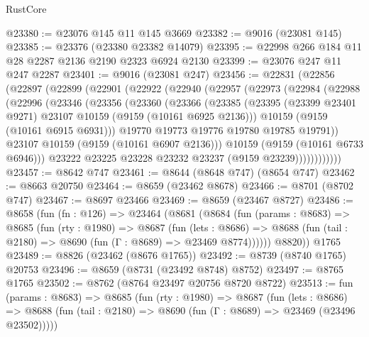 \begin{lexlean}{RustCore}
\begin{coremodule}
@23380 := @23076 @145 @11 @145 @3669
@23382 := @9016 (@23081 @145)
@23385 := @23376 (@23380 @23382 @14079)
@23395 := @22998 @266 @184 @11 @28 @2287 @2136 @2190 @2323 @6924 @2130
@23399 := @23076 @247 @11 @247 @2287
@23401 := @9016 (@23081 @247)
@23456 := @22831
    (@22856
      (@22897
        (@22899
          (@22901
            (@22922
              (@22940
                (@22957
                  (@22973
                    (@22984
                      (@22988
                        (@22996
                          (@23346
                            (@23356
                              (@23360
                                (@23366
                                  (@23385
                                    (@23395
                                      (@23399 @23401 @9271)
                                      @23107
                                      @10159
                                      (@9159 (@10161 @6925 @2136)))
                                    @10159
                                    (@9159 (@10161 @6915 @6931)))
                                  @19770
                                  @19773
                                  @19776
                                  @19780
                                  @19785
                                  @19791))
                              @23107
                              @10159
                              (@9159 (@10161 @6907 @2136)))
                            @10159
                            (@9159 (@10161 @6733 @6946)))
                          @23222
                          @23225
                          @23228
                          @23232
                          @23237
                          (@9159 @23239))))))))))))
@23457 := @8642 @747
@23461 := @8644 (@8648 @747) (@8654 @747)
@23462 := @8663 @20750
@23464 := @8659 (@23462 @8678)
@23466 := @8701 (@8702 @747)
@23467 := @8697 @23466
@23469 := @8659 (@23467 @8727)
@23486 := @8658
    (fun (fn : @126) =>
    @23464
      (@8681
        (@8684
          (fun (params : @8683) =>
          @8685
            (fun (rty : @1980) =>
            @8687
              (fun (lets : @8686) =>
              @8688 (fun (tail : @2180) => @8690 (fun (Γ : @8689) => @23469 @8774))))))
        @8820))
    @1765
@23489 := @8826 (@23462 (@8676 @1765))
@23492 := @8739 (@8740 @1765) @20753
@23496 := @8659 (@8731 (@23492 @8748) @8752)
@23497 := @8765 @1765
@23502 := @8762 (@8764 @23497 @20756 @8720 @8722)
@23513 := fun (params : @8683) =>
  @8685
    (fun (rty : @1980) =>
    @8687
      (fun (lets : @8686) =>
      @8688 (fun (tail : @2180) => @8690 (fun (Γ : @8689) => @23469 (@23496 @23502)))))

\end{coremodule}
\end{lexlean}
